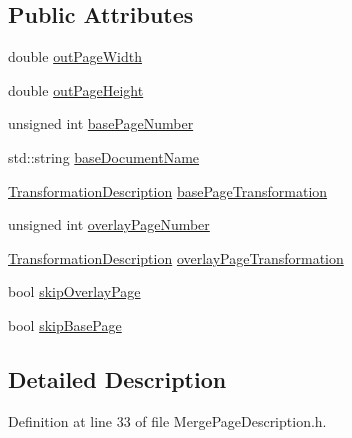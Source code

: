 \subsection*{Public Attributes}
\begin{DoxyCompactItemize}
\item 
double \hyperlink{structmerge__lib_1_1_merge_page_description_ad6b36eb19b4dae99029fcabb092973ee}{out\-Page\-Width}
\item 
double \hyperlink{structmerge__lib_1_1_merge_page_description_a47d237c4b51e371993f1c855a5ba0af6}{out\-Page\-Height}
\item 
unsigned int \hyperlink{structmerge__lib_1_1_merge_page_description_a94f4ed60f98dd2d9c394f7a15915a410}{base\-Page\-Number}
\item 
std\-::string \hyperlink{structmerge__lib_1_1_merge_page_description_a82756e306c69e3ed7bbb18ab07602f1b}{base\-Document\-Name}
\item 
\hyperlink{classmerge__lib_1_1_transformation_description}{Transformation\-Description} \hyperlink{structmerge__lib_1_1_merge_page_description_a843e801e2eb4c707bf54ad24e9ab1a15}{base\-Page\-Transformation}
\item 
unsigned int \hyperlink{structmerge__lib_1_1_merge_page_description_a0de4d9366a467fcac377e8e2bcf8e11f}{overlay\-Page\-Number}
\item 
\hyperlink{classmerge__lib_1_1_transformation_description}{Transformation\-Description} \hyperlink{structmerge__lib_1_1_merge_page_description_af15089010dfa9f89cdffbae0b99d06f0}{overlay\-Page\-Transformation}
\item 
bool \hyperlink{structmerge__lib_1_1_merge_page_description_ae09130909c8a12252d4544bfdfea4138}{skip\-Overlay\-Page}
\item 
bool \hyperlink{structmerge__lib_1_1_merge_page_description_ab89027ad68337b8244cccd9aa9d9a38c}{skip\-Base\-Page}
\end{DoxyCompactItemize}


\subsection{Detailed Description}


Definition at line 33 of file Merge\-Page\-Description.\-h.



